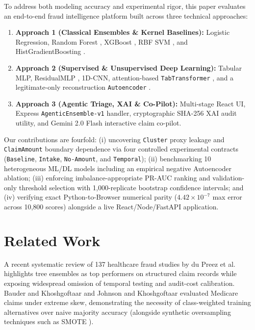 \documentclass[conference]{IEEEtran}
\begin{document}
To address both modeling accuracy and experimental rigor, this paper evaluates an end-to-end fraud intelligence platform built across three technical approaches:
\begin{enumerate}
    \item \textbf{Approach 1 (Classical Ensembles \& Kernel Baselines):} Logistic Regression, Random Forest \cite{breiman2001random}, XGBoost \cite{chen2016xgboost}, RBF SVM \cite{cortes1995support}, and HistGradientBoosting \cite{ke2017lightgbm}.
    \item \textbf{Approach 2 (Supervised \& Unsupervised Deep Learning):} Tabular MLP, ResidualMLP \cite{he2016deep, gorishniy2021revisiting}, 1D-CNN, attention-based \texttt{TabTransformer} \cite{huang2020tabtransformer}, and a legitimate-only reconstruction \texttt{Autoencoder} \cite{sakurada2014anomaly}.
    \item \textbf{Approach 3 (Agentic Triage, XAI & Co-Pilot):} Multi-stage React UI, Express \texttt{AgenticEnsemble-v1} handler, cryptographic SHA-256 XAI audit utility, and Gemini 2.0 Flash interactive claim co-pilot.
\end{enumerate}

Our contributions are fourfold: (i) uncovering \texttt{Cluster} proxy leakage and \texttt{ClaimAmount} boundary dependence via four controlled experimental contracts (\texttt{Baseline}, \texttt{Intake}, \texttt{No-Amount}, and \texttt{Temporal}); (ii) benchmarking 10 heterogeneous ML/DL models including an empirical negative Autoencoder ablation; (iii) enforcing imbalance-appropriate PR-AUC ranking and validation-only threshold selection with 1,000-replicate bootstrap confidence intervals; and (iv) verifying exact Python-to-Browser numerical parity ($4.42 \times 10^{-7}$ max error across 10,800 scores) alongside a live React/Node/FastAPI application.

\section{Related Work}
A recent systematic review of 137 healthcare fraud studies by du Preez et al.\ \cite{dupreez2025fraud} highlights tree ensembles as top performers on structured claim records while exposing widespread omission of temporal testing and audit-cost calibration. Bauder and Khoshgoftaar \cite{bauder2017medicare} and Johnson and Khoshgoftaar \cite{johnson2019medicare} evaluated Medicare claims under extreme skew, demonstrating the necessity of class-weighted training alternatives over naive majority accuracy (alongside synthetic oversampling techniques such as SMOTE \cite{chawla2002smote}).
\end{document}
